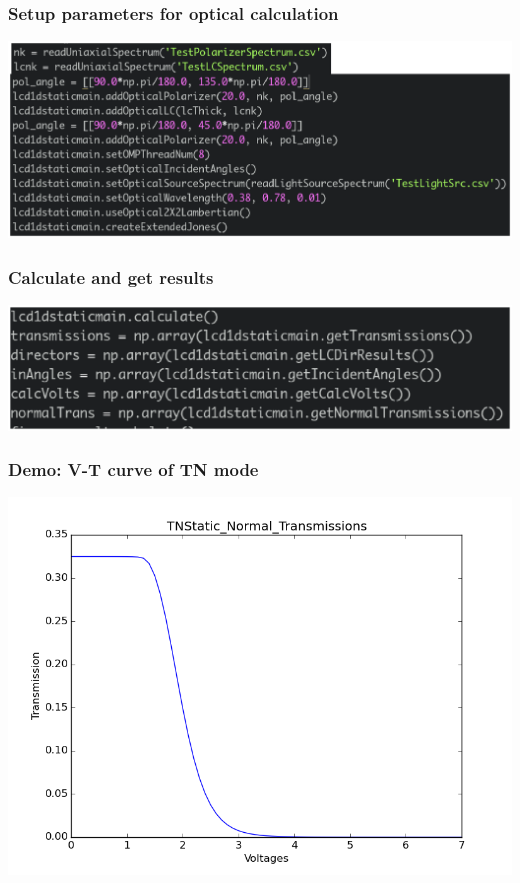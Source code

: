 \documentclass{beamer}
\begin{document}
\begin{frame}
\frametitle{Setup parameters for optical calculation}
\begin{center}
\includegraphics[scale=0.4]{setup_opt.eps}
\end{center}
\end{frame}
\begin{frame}
\frametitle{Calculate and get results}
\begin{center}
\includegraphics[scale=0.4]{calc_results.eps}
\end{center}
\end{frame}
\begin{frame}
\frametitle{Demo: V-T curve of TN mode}
\begin{center}
\includegraphics[scale=0.4]{VT_demo.png}
\end{center}
\end{frame}
\end{document}
